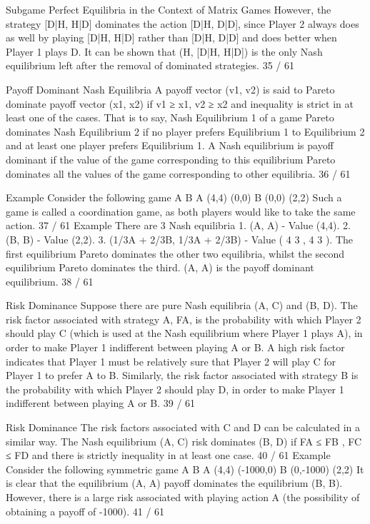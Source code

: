 Subgame Perfect Equilibria in the Context of Matrix Games
However, the strategy [D|H, H|D] dominates the action
[D|H, D|D], since Player 2 always does as well by playing
[D|H, H|D] rather than [D|H, D|D] and does better when Player 1
plays D.
It can be shown that (H, [D|H, H|D]) is the only Nash equilibrium
left after the removal of dominated strategies.
35 / 61

Payoff Dominant Nash Equilibria
A payoff vector (v1, v2) is said to Pareto dominate payoff vector
(x1, x2) if v1 ≥ x1, v2 ≥ x2 and inequality is strict in at least one of
the cases.
That is to say, Nash Equilibrium 1 of a game Pareto dominates
Nash Equilibrium 2 if no player prefers Equilibrium 1 to Equilibrium
2 and at least one player prefers Equilibrium 1.
A Nash equilibrium is payoff dominant if the value of the game
corresponding to this equilibrium Pareto dominates all the values
of the game corresponding to other equilibria.
36 / 61

Example
Consider the following game
A B
A (4,4) (0,0)
B (0,0) (2,2)
Such a game is called a coordination game, as both players would
like to take the same action.
37 / 61
Example
There are 3 Nash equilibria
1. (A, A) - Value (4,4).
2. (B, B) - Value (2,2).
3. (1/3A + 2/3B, 1/3A + 2/3B) - Value ( 4
3
,
4
3
).
The first equilibrium Pareto dominates the other two equilibria,
whilst the second equilibrium Pareto dominates the third.
(A, A) is the payoff dominant equilibrium.
38 / 61

Risk Dominance
Suppose there are pure Nash equilibria (A, C) and (B, D).
The risk factor associated with strategy A, FA, is the probability
with which Player 2 should play C (which is used at the Nash
equilibrium where Player 1 plays A), in order to make Player 1
indifferent between playing A or B.
A high risk factor indicates that Player 1 must be relatively sure
that Player 2 will play C for Player 1 to prefer A to B.
Similarly, the risk factor associated with strategy B is the
probability with which Player 2 should play D, in order to make
Player 1 indifferent between playing A or B.
39 / 61

Risk Dominance
The risk factors associated with C and D can be calculated in a
similar way.
The Nash equilibrium (A, C) risk dominates (B, D) if FA ≤ FB ,
FC ≤ FD and there is strictly inequality in at least one case.
40 / 61
Example
Consider the following symmetric game
A B
A (4,4) (-1000,0)
B (0,-1000) (2,2)
It is clear that the equilibrium (A, A) payoff dominates the
equilibrium (B, B). However, there is a large risk associated with
playing action A (the possibility of obtaining a payoff of -1000).
41 / 61

